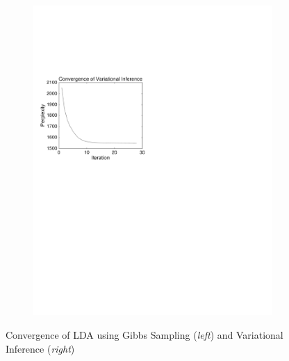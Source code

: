 \documentclass{article} %
\begin{document}
\begin{figure}
\begin{subfigure}{.5\linewidth}
\includegraphics[width=1\textwidth]{AP_topics_10_VI_Perplexity}
\end{subfigure}
\caption{Convergence of LDA using Gibbs Sampling (\textit{left}) and Variational Inference (\textit{right})}\label{fig:convergence}
\end{figure}
\end{document}
